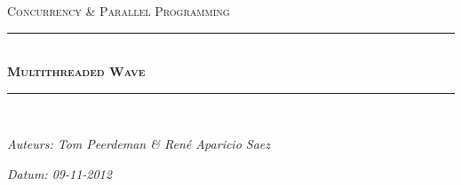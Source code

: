\documentclass[a4paper]{article}
\newcommand{\HRule}{\rule{\linewidth}{0.5mm}}
\begin{document}
	\begin{titlepage}
	\begin{center}
		\textsc{\Large Concurrency \& Parallel Programming}\\[0.5cm]
		\HRule \\[0,4cm]
		\textsc{\huge \bfseries Multithreaded Wave}
		\HRule \\[8cm]
		\begin{minipage}{0.4\textwidth}
			\begin{flushleft}\large
				\emph{Auteurs: Tom Peerdeman \& Ren\'e Aparicio Saez}\\
			\end{flushleft}
		\end{minipage}
		\begin{minipage}{0.4\textwidth}
			\begin{flushright}\large
			\emph{Datum: 09-11-2012\\\hspace{1cm}}\\
			\end{flushright}
		\end{minipage}
	\end{center}
	\end{titlepage}
\end{document}
